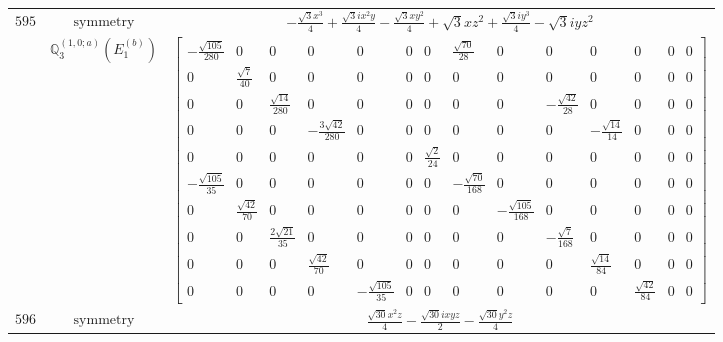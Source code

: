 \documentclass[fleqn,8pt,landscape]{jsarticle}
\begin{document}
\begin{longtable}{ccc}
$ 595 $ & $ \text{symmetry} $ & $ - \frac{\sqrt{3} x^{3}}{4} + \frac{\sqrt{3} i x^{2} y}{4} - \frac{\sqrt{3} x y^{2}}{4} + \sqrt{3} x z^{2} + \frac{\sqrt{3} i y^{3}}{4} - \sqrt{3} i y z^{2} $ \\
$  $ & $ \mathbb{Q}_{3}^{(1,0;a)}(E_{1}^{(b)}) $ & $ \begin{bmatrix} - \frac{\sqrt{105}}{280} & 0 & 0 & 0 & 0 & 0 & 0 & \frac{\sqrt{70}}{28} & 0 & 0 & 0 & 0 & 0 & 0 \\ 0 & \frac{\sqrt{7}}{40} & 0 & 0 & 0 & 0 & 0 & 0 & 0 & 0 & 0 & 0 & 0 & 0 \\ 0 & 0 & \frac{\sqrt{14}}{280} & 0 & 0 & 0 & 0 & 0 & 0 & - \frac{\sqrt{42}}{28} & 0 & 0 & 0 & 0 \\ 0 & 0 & 0 & - \frac{3 \sqrt{42}}{280} & 0 & 0 & 0 & 0 & 0 & 0 & - \frac{\sqrt{14}}{14} & 0 & 0 & 0 \\ 0 & 0 & 0 & 0 & 0 & 0 & \frac{\sqrt{2}}{24} & 0 & 0 & 0 & 0 & 0 & 0 & 0 \\ - \frac{\sqrt{105}}{35} & 0 & 0 & 0 & 0 & 0 & 0 & - \frac{\sqrt{70}}{168} & 0 & 0 & 0 & 0 & 0 & 0 \\ 0 & \frac{\sqrt{42}}{70} & 0 & 0 & 0 & 0 & 0 & 0 & - \frac{\sqrt{105}}{168} & 0 & 0 & 0 & 0 & 0 \\ 0 & 0 & \frac{2 \sqrt{21}}{35} & 0 & 0 & 0 & 0 & 0 & 0 & - \frac{\sqrt{7}}{168} & 0 & 0 & 0 & 0 \\ 0 & 0 & 0 & \frac{\sqrt{42}}{70} & 0 & 0 & 0 & 0 & 0 & 0 & \frac{\sqrt{14}}{84} & 0 & 0 & 0 \\ 0 & 0 & 0 & 0 & - \frac{\sqrt{105}}{35} & 0 & 0 & 0 & 0 & 0 & 0 & \frac{\sqrt{42}}{84} & 0 & 0 \end{bmatrix} $ \\ \hline
$ 596 $ & $ \text{symmetry} $ & $ \frac{\sqrt{30} x^{2} z}{4} - \frac{\sqrt{30} i x y z}{2} - \frac{\sqrt{30} y^{2} z}{4} $ \\

\end{longtable}
\end{document}
